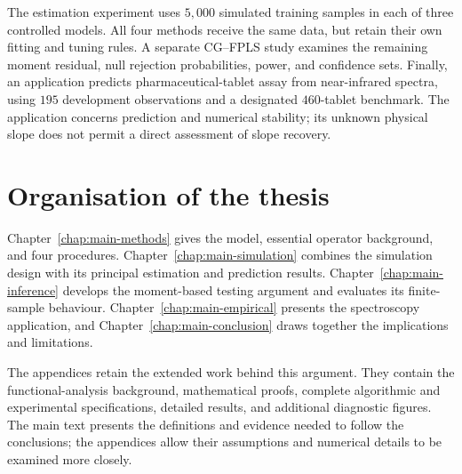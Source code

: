 The estimation experiment uses $5{,}000$ simulated training samples in each
of three controlled models. All four methods receive the same data, but
retain their own fitting and tuning rules. A separate CG--FPLS study
examines the remaining moment residual, null rejection probabilities, power,
and confidence sets. Finally, an application predicts pharmaceutical-tablet
assay from near-infrared spectra, using $195$ development observations and
a designated $460$-tablet benchmark. The application concerns prediction
and numerical stability; its unknown physical slope does not permit a
direct assessment of slope recovery.

\section{Organisation of the thesis}

Chapter~\ref{chap:main-methods} gives the model, essential operator
background, and four procedures. Chapter~\ref{chap:main-simulation}
combines the simulation design with its principal estimation and prediction
results. Chapter~\ref{chap:main-inference} develops the moment-based
testing argument and evaluates its finite-sample behaviour.
Chapter~\ref{chap:main-empirical} presents the spectroscopy application,
and Chapter~\ref{chap:main-conclusion} draws together the implications
and limitations.

The appendices retain the extended work behind this argument. They contain
the functional-analysis background, mathematical proofs, complete algorithmic
and experimental specifications, detailed results, and additional diagnostic
figures. The main text presents the definitions and evidence needed to
follow the conclusions; the appendices allow their assumptions and numerical
details to be examined more closely.
